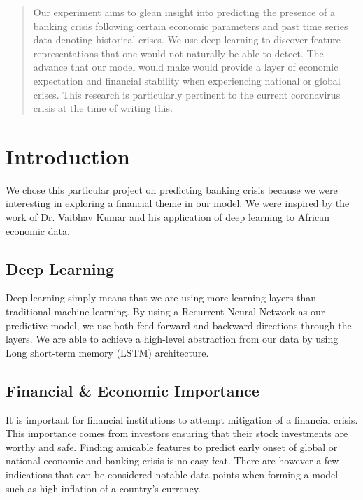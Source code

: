 \documentclass[12pt]{article}
\begin{document}
\maketitle

\begin{abstract}
Our experiment aims to glean insight into predicting the presence of a banking crisis following certain economic parameters and past time series data denoting historical crises. We use deep learning to discover feature representations that one would not naturally be able to detect. The advance that our model would make would provide a layer of economic expectation and financial stability when experiencing national or global crises. This research is particularly pertinent to the current coronavirus crisis at the time of writing this.
\end{abstract}


\section{Introduction}

We chose this particular project on predicting banking crisis because we were interesting in exploring a financial theme in our model. We were inspired by the work of Dr. Vaibhav Kumar and his application of deep learning to African economic data.

\subsection{Deep Learning}
Deep learning simply means that we are using more learning layers than traditional machine learning. By using a Recurrent Neural Network as our predictive model, we use both feed-forward and backward directions through the layers. We are able to achieve a high-level abstraction from our data by using Long short-term memory (LSTM) architecture\cite{kumar}.

\subsection{Financial \& Economic Importance}
It is important for financial institutions to attempt mitigation of a financial crisis.  This importance comes from investors ensuring that their stock investments are worthy and safe. Finding amicable features to predict early onset of global or national economic and banking crisis is no easy feat. There are however a few indications that can be considered notable data points when forming a model such as high inflation of a country's currency\cite{kumar}. 
\end{document}

